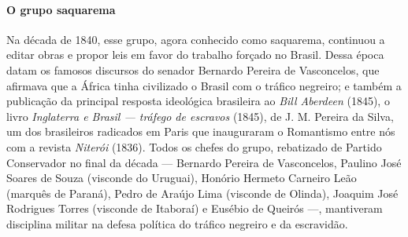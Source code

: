\paragraph{O grupo saquarema}
Na década de 1840, esse grupo, agora conhecido como saquarema, continuou
a editar obras e propor leis em favor do trabalho forçado no Brasil.
Dessa época datam os famosos discursos do senador Bernardo Pereira de
Vasconcelos, que afirmava que a África tinha civilizado o Brasil com o
tráfico negreiro; e também a publicação da principal resposta
ideológica brasileira ao \textit{Bill Aberdeen} (1845), o livro
\textit{Inglaterra e Brasil --- tráfego de escravos} (1845), de J. M.
Pereira da Silva, um dos brasileiros radicados em Paris que inauguraram
o Romantismo entre nós com a revista \textit{Niterói} (1836). Todos os
chefes do grupo, rebatizado de Partido Conservador no final da década ---
Bernardo Pereira de Vasconcelos, Paulino José Soares de Souza (visconde
do Uruguai), Honório Hermeto Carneiro Leão (marquês de Paraná), Pedro
de Araújo Lima (visconde de Olinda), Joaquim José Rodrigues Torres
(visconde de Itaboraí) e Eusébio de Queirós ---, mantiveram disciplina
militar na defesa política do tráfico negreiro e da escravidão. 

